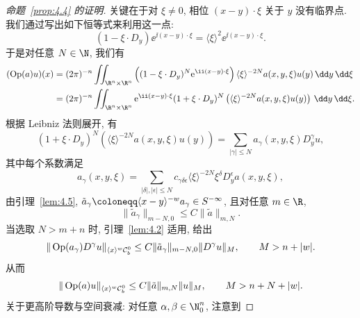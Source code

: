 \begin{proof}[命题~\ref{prop:4.4} 的证明]
关键在于对 $\xi \neq 0$, 相位 $(x - y) \cdot \xi$ 关于 $y$ 没有临界点. 我们通过写出如下恒等式来利用这一点:
\begin{equation}\label{eq:4.14}
    (1 - \xi \cdot D_y) \ee^{\ii(x-y)\cdot\xi} = \langle \xi \rangle^2 \ee^{\ii(x-y)\cdot\xi}.
\end{equation}
于是对任意 $N \in \N$, 我们有
\begin{equation}\label{eq:4.15}
    \begin{aligned}
        (\Op(a) u)(x) &= (2\pi)^{-n} \iint_{\R^n \times \R^n} \left( (1 - \xi \cdot D_y)^N \ee^{\ii (x-y) \cdot \xi} \right) \langle \xi \rangle^{-2N} a(x, y, \xi) u(y) \,\dd y \,\dd\xi \\
        &= (2\pi)^{-n} \iint_{\R^n \times \R^n} \ee^{\ii (x-y) \cdot \xi} (1 + \xi \cdot D_y)^N \left( \langle \xi \rangle^{-2N} a(x, y, \xi) u(y) \right) \,\dd y \,\dd\xi.
    \end{aligned}
\end{equation}
根据 Leibniz 法则展开, 有
\begin{equation}\label{eq:4.16}
    (1 + \xi \cdot D_y)^N \left( \langle \xi \rangle^{-2N} a(x, y, \xi) u(y) \right) = \sum_{|\gamma| \le N} a_\gamma(x, y, \xi) D_y^\gamma u,
\end{equation}
其中每个系数满足
\begin{equation}\label{eq:4.17}
    a_\gamma(x, y, \xi) = \sum_{|\delta|, |\epsilon| \le N} c_{\gamma\delta\epsilon} \langle \xi \rangle^{-2N} \xi^\delta D_y^\epsilon a(x, y, \xi),
\end{equation}
由引理~\ref{lem:4.5}, $\tilde{a}_\gamma \defeq \langle x - y \rangle^{-w} a_\gamma \in S^{-\infty}$, 且对任意 $m \in \R$,
\begin{equation}\label{eq:4.18}
    \|\tilde{a}_\gamma\|_{m-N, 0} \le C \|\tilde{a}\|_{m, N}.
\end{equation}
当选取 $N > m + n$ 时, 引理~\ref{lem:4.2} 适用, 给出
\begin{equation}\label{eq:4.19}
    \|\operatorname{Op}(a_\gamma) D^\gamma u\|_{\langle x \rangle^w \mathcal{C}_b^0} \le C \|\tilde{a}_\gamma\|_{m-N, 0} \|D^\gamma u\|_M, \qquad M > n + |w|.
\end{equation}
从而
\begin{equation}\label{eq:4.20}
    \|\operatorname{Op}(a) u\|_{\langle x \rangle^w \mathcal{C}_b^0} \le C \|\tilde{a}\|_{m, N} \|u\|_M, \qquad M > n + N + |w|.
\end{equation}
关于更高阶导数与空间衰减: 对任意 $\alpha, \beta \in \N_0^n$, 注意到

\end{proof}
